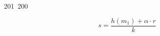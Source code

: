 201~200~\documentclass{article}
\begin{document}
	                                                                        	                                                                    	                                	                    	                    	                        	                        	                    	                                                                	                	                                                                    	                    							                                                                                                                                                                                                    		                                                                                                                        \[
	                                                                        	                                                                    	                                	                    	                    	                        	                        	                    	                                                                	                	                                                                    	                    							                                                                                                                                                                                                    		                                                                                                                        	s = \frac{h(m_1) + \alpha \cdot r}{k}
	                                                                        	                                                                    	                                	                    	                    	                        	                        	                    	                                                                	                	                                                                    	                    							                                                                                                                                                                                                    		                                                                                                                        	\]
\end{document}
